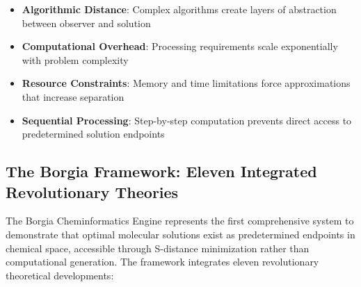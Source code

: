 \documentclass[11pt,a4paper]{article}
\begin{document}
\begin{itemize}
\item \textbf{Algorithmic Distance}: Complex algorithms create layers of abstraction between observer and solution
\item \textbf{Computational Overhead}: Processing requirements scale exponentially with problem complexity
\item \textbf{Resource Constraints}: Memory and time limitations force approximations that increase separation
\item \textbf{Sequential Processing}: Step-by-step computation prevents direct access to predetermined solution endpoints
\end{itemize}

\subsection{The Borgia Framework: Eleven Integrated Revolutionary Theories}

The Borgia Cheminformatics Engine represents the first comprehensive system to demonstrate that optimal molecular solutions exist as predetermined endpoints in chemical space, accessible through S-distance minimization rather than computational generation. The framework integrates eleven revolutionary theoretical developments:
\end{document}
